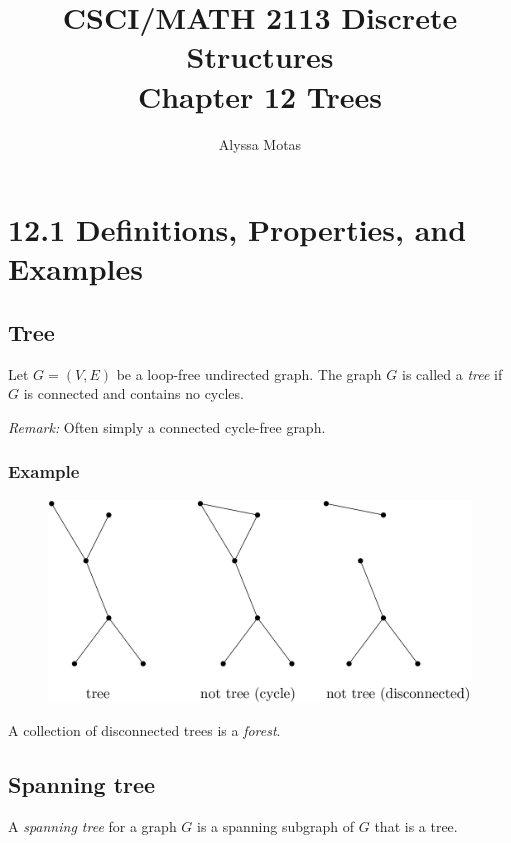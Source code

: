 \documentclass[11pt]{article}
\title{\textbf{CSCI/MATH 2113 Discrete Structures} \\ Chapter 12 Trees}
\author{Alyssa Motas}
\begin{document}
    \maketitle

    \pagebreak

    \tableofcontents

    \pagebreak

    \section{12.1 Definitions, Properties, and Examples}

    \subsection{Tree}

    Let \(G = (V,E)\) be a loop-free undirected graph. The graph $G$ is called a \emph{tree} if $G$ is connected and contains no cycles.

    \emph{Remark:} Often simply a connected cycle-free graph.

    \subsubsection{Example}

    \begin{figure}[H]
        \centering
        \includegraphics[scale=0.2]{trees.png}
    \end{figure}

    A collection of disconnected trees is a \emph{forest}. 

    \subsection{Spanning tree}

    A \emph{spanning tree} for a graph $G$ is a spanning subgraph of $G$ that is a tree.
\end{document}

